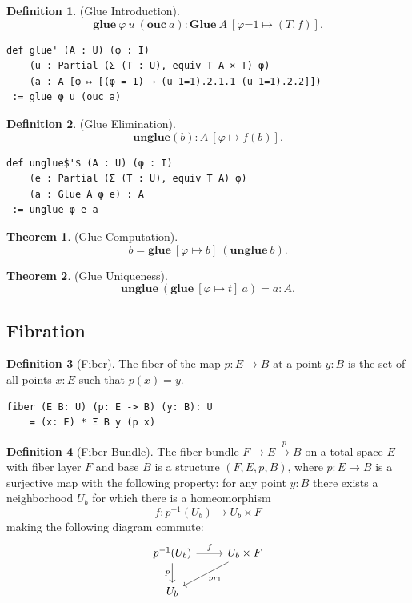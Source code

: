 \documentclass{article}
\theoremstyle{definition}
\newtheorem{definition}{Definition}
\newtheorem{theorem}{Theorem}
\begin{document}
\begin{definition} (Glue Introduction).
$$
  \mathbf{glue}\ \varphi\ u\ (\mathbf{ouc}\ a) : \mathbf{Glue}\ A\ [\varphi\mbox{=}1 \mapsto (T,f)].
$$
\begin{lstlisting}[mathescape=true]
def glue' (A : U) (φ : I)
    (u : Partial (Σ (T : U), equiv T A × T) φ)
    (a : A [φ ↦ [(φ = 1) → (u 1=1).2.1.1 (u 1=1).2.2]])
 := glue φ u (ouc a)
\end{lstlisting}
\end{definition}

\begin{definition} (Glue Elimination).
$$
  \mathbf{unglue}(b) : A\ [\varphi \mapsto f(b) ].
$$
\begin{lstlisting}[mathescape=true]
def unglue$'$ (A : U) (φ : I)
    (e : Partial (Σ (T : U), equiv T A) φ)
    (a : Glue A φ e) : A
 := unglue φ e a
\end{lstlisting}
\end{definition}

\begin{theorem} (Glue Computation).
$$
  b = \mathbf{glue}\ [\varphi \mapsto b]\ (\mathbf{unglue}\ b).
$$
\end{theorem}

\begin{theorem} (Glue Uniqueness).
$$
  \mathbf{unglue}\ (\mathbf{glue}\ [\varphi \mapsto t]\ a) = a : A.
$$
\end{theorem}

\newpage
\subsection{Fibration}

\begin{definition}[Fiber]
The fiber of the map \( p: E \rightarrow B \) at a point \( y: B \)
is the set of all points \( x: E \) such that \( p(x) = y \).

\begin{lstlisting}[mathescape=true]
fiber (E B: U) (p: E -> B) (y: B): U
    = (x: E) * Ξ B y (p x)
\end{lstlisting}
\end{definition}

\begin{definition}[Fiber Bundle]
The fiber bundle \( F \rightarrow E \xrightarrow{p} B \) on a
total space \( E \) with fiber layer \( F \) and base \( B \) is a structure \( (F,E,p,B) \),
where \( p: E \rightarrow B \) is a surjective map with the following property:
for any point \( y: B \) there exists a neighborhood \( U_b \)
for which there is a homeomorphism
\[
f: p^{-1}(U_b) \rightarrow U_b \times F
\]
making the following diagram commute:
\[
\begin{tikzcd}
p^{-1}(U_b) \arrow[r, "f"] \arrow[d, "p"'] & U_b \times F \arrow[dl, "pr_1"] \\
U_b &
\end{tikzcd}
\]
\end{definition}
\end{document}
